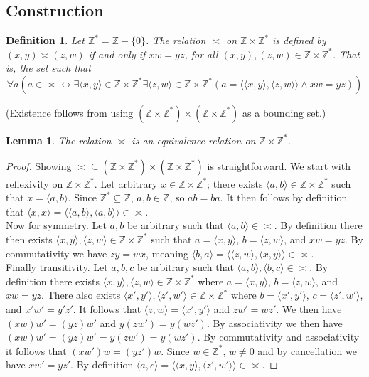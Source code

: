 \documentclass{report}
\newtheorem{lemma}[theo]{Lemma}
\newtheorem{definition}[theo]{Definition}
\begin{document}
\subsection{Construction}
\begin{definition}
Let $\mathbb Z^*=\mathbb Z-\{0\}$. The relation $\asymp$ on $\mathbb Z\times\mathbb Z^*$ is defined by $(x,y)\asymp(z,w)$ if and only if
$xw=yz$, for all $(x,y),(z,w)\in\mathbb Z\times\mathbb Z^*$. That is, the set such that 
\begin{equation*}
\forall a(a\in\asymp\leftrightarrow\exists\langle x,y\rangle\in\mathbb Z\times\mathbb Z^*
\exists\langle z,w\rangle\in\mathbb Z\times\mathbb Z^*(a=\langle\langle x,y\rangle,\langle z,w\rangle\rangle\land xw=yz))
\end{equation*}
\end{definition}
\noindent(Existence follows from using $(\mathbb Z\times\mathbb Z^*)\times(\mathbb Z\times\mathbb Z^*)$
as a bounding set.)
\begin{lemma}
The relation $\asymp$ is an equivalence relation on $\mathbb Z\times\mathbb Z^*$.
\end{lemma}
\begin{proof}
Showing $\asymp\subseteq(\mathbb Z\times\mathbb Z^*)\times(\mathbb Z\times\mathbb Z^*)$ is straightforward. We start with reflexivity on 
$\mathbb Z\times\mathbb Z^*$. Let arbitrary $x\in\mathbb Z\times\mathbb Z^*$; there exists $\langle a,b\rangle\in\mathbb Z\times\mathbb Z^*$ 
such that $x=\langle a,b\rangle$. Since $\mathbb Z^*\subseteq\mathbb Z$, $a,b\in\mathbb Z$, so $ab=ba$. It then follows by definition
that $\langle x,x\rangle=\langle\langle a,b\rangle,\langle a,b\rangle\rangle\in\asymp$.\\
\indent Now for symmetry. Let $a,b$ be arbitrary such that $\langle a,b\rangle\in\asymp$. By definition there then exists 
$\langle x,y\rangle,\langle z,w\rangle\in\mathbb Z\times\mathbb Z^*$ such that $a=\langle x,y\rangle$, $b=\langle z,w\rangle$, and $xw=yz$.
By commutativity we have $zy=wx$, meaning $\langle b,a\rangle=\langle\langle z,w\rangle,\langle x,y\rangle\rangle\in\asymp$.\\
\indent Finally transitivity. Let $a,b,c$ be arbitrary such that $\langle a,b\rangle,\langle b,c\rangle\in\asymp$. 
By definition there exists $\langle x,y\rangle,\langle z,w\rangle\in\mathbb Z\times\mathbb Z^*$ where $a=\langle x,y\rangle$, $b=\langle z,w\rangle$,
and $xw=yz$. There also exists
$\langle x',y'\rangle,\langle z',w'\rangle\in\mathbb Z\times\mathbb Z^*$ where $b=\langle x',y'\rangle$, $c=\langle z',w'\rangle$,
and $x'w'=y'z'$.
It follows that $\langle z,w\rangle=\langle x',y'\rangle$ and $zw'=wz'$.
We then have $(xw)w'=(yz)w'$ and $y(zw')=y(wz')$. By associativity we then have $(xw)w'=(yz)w'=y(zw')=y(wz')$. By commutativity and associativity
it follows that $(xw')w=(yz')w$. Since $w\in\mathbb Z^*$, $w\neq0$ and 
by cancellation we have $xw'=yz'$. By definition 
$\langle a,c\rangle=\langle\langle x,y\rangle,\langle z',w'\rangle\rangle\in\asymp$.
\end{proof}
\end{document}
